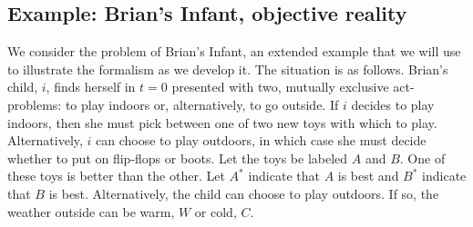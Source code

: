 \documentclass[
11pt,
titlepage,
reqno,
]{article}%
\theoremstyle{definition}
\begin{document}
\subsection{Example: Brian's Infant, objective reality}	
We consider the problem of Brian's Infant, an extended example that we will use  to illustrate the formalism as we develop it.
The situation is as follows.
Brian's child, $i$, finds herself in $t=0$ presented with two, mutually exclusive act-problems: to play indoors or, alternatively, to go outside. 
If $i$ decides to play indoors, then she must pick between one of two new toys with which to play.
Alternatively, $i$ can choose to play outdoors, in which case she must decide whether to put on flip-flops or boots.
Let the toys be labeled $A$ and $B$. 
One of these toys is better than the other. 
Let $A^\ast$ indicate that $A$ is best and $B^\ast$ indicate that $B$ is best. 
Alternatively, the child can choose to play outdoors.
If so,  the weather outside can be warm, $W$ or cold, $C$.
 
\end{document}
